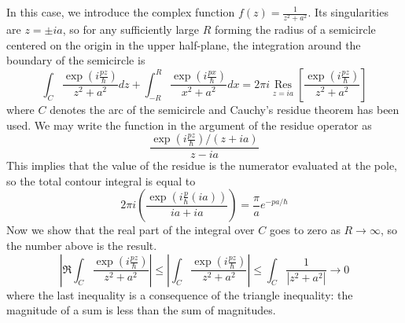 \documentclass{article}
\DeclareMathOperator{\Res}{Res}
\begin{document}
In this case, we introduce the complex function $f(z)=\frac{1}{z^2+a^2}$. Its singularities are $z=\pm ia$, so for any sufficiently large $R$ forming the radius of a semicircle centered on the origin in the upper half-plane, the integration around the boundary of the semicircle is
\[\int_C\frac{\exp\left( i\frac{pz}{\hbar} \right)}{z^2+a^2}dz+\int_{-R}^R\frac{\exp\left( i\frac{px}{\hbar} \right)}{x^2+a^2}dx=2\pi i\underset{z=ia}{\Res} \left[ \frac{\exp\left( i\frac{pz}{\hbar} \right)}{z^2+a^2}\right]\]
where $C$ denotes the arc of the semicircle and Cauchy's residue theorem has been used. We may write the function in the argument of the residue operator as
\[\frac{\exp\left( i\frac{pz}{\hbar} \right)/(z+ia)}{z-ia}\]
This implies that the value of the residue is the numerator evaluated at the pole, so the total contour integral is equal to
\[2\pi i\left( \frac{\exp\left( i\frac{p}{\hbar}(ia) \right)}{ia+ia} \right)=\frac{\pi}{a}e^{-pa/\hbar}\]
Now we show that the real part of the integral over $C$ goes to zero as $R\to\infty$, so the number above is the result.
\[\left| \Re\int_C\frac{\exp\left( i\frac{pz}{\hbar} \right)}{z^2+a^2} \right|\leq \left| \int_C\frac{\exp\left( i\frac{pz}{\hbar} \right)}{z^2+a^2} \right|\leq \int_C\frac{1}{|z^2+a^2|}\to 0\]
where the last inequality is a consequence of the triangle inequality: the magnitude of a sum is less than the sum of magnitudes.
\end{document}
